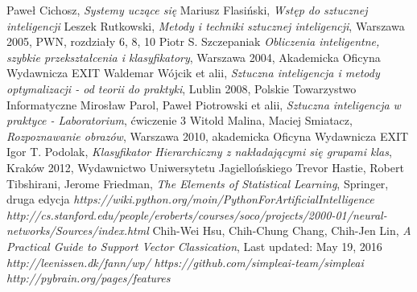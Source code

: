 \documentclass[12pt,a4paper,oneside]{report} %
\begin{document}
\begin{thebibliography}{9}
 Paweł Cichosz, \emph{Systemy uczące się}
 Mariusz Flasiński, \emph{Wstęp do sztucznej inteligencji}
 Leszek Rutkowski, \emph{Metody i techniki sztucznej inteligencji}, Warszawa 2005, PWN, rozdziały 6, 8, 10
 Piotr S. Szczepaniak \emph{Obliczenia inteligentne, szybkie przekształcenia i klasyfikatory}, Warszawa 2004, Akademicka Oficyna Wydawnicza EXIT
 Waldemar Wójcik et alii, \emph{Sztuczna inteligencja i metody optymalizacji - od teorii do praktyki}, Lublin 2008, Polskie Towarzystwo Informatyczne
 Mirosław Parol, Paweł Piotrowski et alii, \emph{Sztuczna inteligencja w praktyce - Laboratorium}, ćwiczenie 3
 Witold Malina, Maciej Smiatacz, \emph{Rozpoznawanie obrazów}, Warszawa 2010, akademicka Oficyna Wydawnicza EXIT
 Igor T. Podolak, \emph{Klasyfikator Hierarchiczny z nakładającymi się grupami klas}, Kraków 2012, Wydawnictwo Uniwersytetu Jagiellońskiego
 Trevor Hastie, Robert Tibshirani, Jerome Friedman, \emph{The Elements of Statistical Learning}, Springer, druga edycja
 \emph{https://wiki.python.org/moin/PythonForArtificialIntelligence}
 \emph{http://cs.stanford.edu/people/eroberts/courses/soco/projects/2000-01/neural-networks/Sources/index.html}
Chih-Wei Hsu, Chih-Chung Chang, Chih-Jen Lin, \emph{A Practical Guide to Support Vector Classication}, Last updated: May 19, 2016
 \emph{http://leenissen.dk/fann/wp/}
 \emph{https://github.com/simpleai-team/simpleai}
 \emph{http://pybrain.org/pages/features}
\end{thebibliography}
\end{document}
